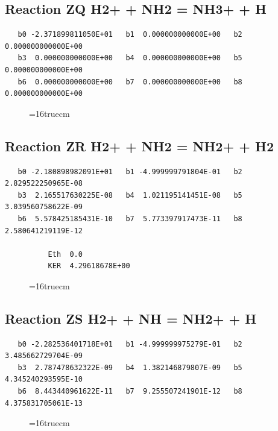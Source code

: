\documentclass[12pt,dvipdfm]{article}
\begin{document}
\subsection{
Reaction ZQ H2+ + NH2 = NH3+ + H }
\begin{small}\begin{verbatim}
   b0 -2.371899811050E+01   b1  0.000000000000E+00   b2  0.000000000000E+00
   b3  0.000000000000E+00   b4  0.000000000000E+00   b5  0.000000000000E+00
   b6  0.000000000000E+00   b7  0.000000000000E+00   b8  0.000000000000E+00
\end{verbatim}\end{small}
\begin{figure}[h!] \label{n2rates}
\epsfxsize=16truecm
\end{figure}
\newpage

\subsection{
Reaction ZR H2+ + NH2 = NH2+ + H2 }
\begin{small}\begin{verbatim}
   b0 -2.180898982091E+01   b1 -4.999999791804E-01   b2  2.829522250965E-08
   b3  2.165517630225E-08   b4  1.021195141451E-08   b5  3.039560758622E-09
   b6  5.578425185431E-10   b7  5.773397917473E-11   b8  2.580641219119E-12

          Eth  0.0
          KER  4.29618678E+00
\end{verbatim}\end{small}
\begin{figure}[h!] \label{n2rates}
\epsfxsize=16truecm
\end{figure}
\newpage

\subsection{
Reaction ZS H2+ + NH = NH2+ + H }
\begin{small}\begin{verbatim}
   b0 -2.282536401718E+01   b1 -4.999999975279E-01   b2  3.485662729704E-09
   b3  2.787478632322E-09   b4  1.382146879807E-09   b5  4.345240293595E-10
   b6  8.443440961622E-11   b7  9.255507241901E-12   b8  4.375831705061E-13
\end{verbatim}\end{small}
\begin{figure}[h!] \label{n2rates}
\epsfxsize=16truecm
\end{figure}
\newpage
\end{document}
